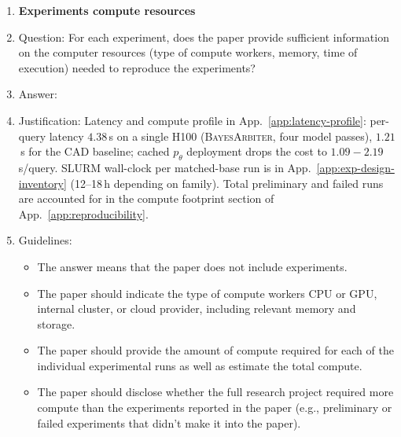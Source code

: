 \begin{enumerate}
\item \textbf{Experiments compute resources}
    \item[] Question: For each experiment, does the paper provide sufficient information on the computer resources (type of compute workers, memory, time of execution) needed to reproduce the experiments?
    \item[] Answer: \answerYes{}
    \item[] Justification: Latency and compute profile in App.~\ref{app:latency-profile}: per-query latency $4.38$\,s on a single H100 (\textsc{BayesArbiter}, four model passes), $1.21$\,s for the CAD baseline; cached $p_\theta$ deployment drops the cost to $1.09\!-\!2.19$\,s/query. SLURM wall-clock per matched-base run is in App.~\ref{app:exp-design-inventory} (12--18\,h depending on family). Total preliminary and failed runs are accounted for in the compute footprint section of App.~\ref{app:reproducibility}.
    \item[] Guidelines:
    \begin{itemize}
        \item The answer \answerNA{} means that the paper does not include experiments.
        \item The paper should indicate the type of compute workers CPU or GPU, internal cluster, or cloud provider, including relevant memory and storage.
        \item The paper should provide the amount of compute required for each of the individual experimental runs as well as estimate the total compute.
        \item The paper should disclose whether the full research project required more compute than the experiments reported in the paper (e.g., preliminary or failed experiments that didn't make it into the paper).
    \end{itemize}


\end{enumerate}
